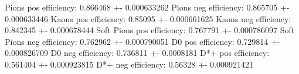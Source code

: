 Pions pos efficiency: 0.866468 +- 0.000633262
Pions neg efficiency: 0.865705 +- 0.000633446
Kaons pos efficiency: 0.85095 +- 0.000661625
Kaons neg efficiency: 0.842345 +- 0.000678444
Soft Pions pos efficiency: 0.767791 +- 0.000786097
Soft Pions neg efficiency: 0.762962 +- 0.000790051
D0 pos efficiency: 0.729814 +- 0.000826709
D0 neg efficiency: 0.736811 +- 0.0008181
D*+ pos efficiency: 0.561404 +- 0.000923815
D*+ neg efficiency: 0.56328 +- 0.000921421